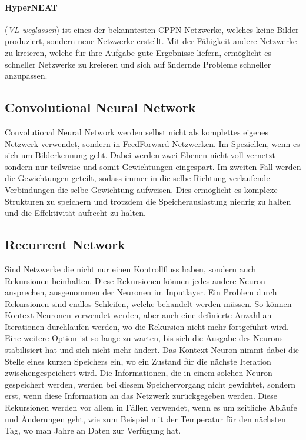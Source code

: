 \paragraph{HyperNEAT} (\textit{VL weglassen}) ist eines der bekanntesten CPPN Netzwerke, welches keine Bilder produziert, sondern neue Netzwerke erstellt.
Mit der Fähigkeit andere Netzwerke zu kreieren, welche für ihre Aufgabe gute Ergebnisse liefern, ermöglicht es schneller Netzwerke zu kreieren und sich auf ändernde Probleme schneller anzupassen.

\subsection{Convolutional Neural Network}

Convolutional Neural Network werden selbst nicht als komplettes eigenes Netzwerk verwendet, sondern in FeedForward Netzwerken.
Im Speziellen, wenn es sich um Bilderkennung geht.
Dabei werden zwei Ebenen nicht voll vernetzt sondern nur teilweise und somit Gewichtungen eingespart.
Im zweiten Fall werden die Gewichtungen geteilt, sodass immer in die selbe Richtung verlaufende Verbindungen die selbe Gewichtung aufweisen.
Dies ermöglicht es komplexe Strukturen zu speichern und trotzdem die Speicherauslastung niedrig zu halten und die Effektivität aufrecht zu halten.


\subsection{Recurrent Network}

Sind Netzwerke die nicht nur einen Kontrollfluss haben, sondern auch Rekursionen beinhalten. 
Diese Rekursionen können jedes andere Neuron ansprechen, ausgenommen der Neuronen im Inputlayer.
Ein Problem durch Rekursionen sind endlos Schleifen, welche behandelt werden müssen.
So können Kontext Neuronen verwendet werden, aber auch eine definierte Anzahl an Iterationen durchlaufen werden, wo die Rekursion nicht mehr fortgeführt wird. 
Eine weitere Option ist so lange zu warten, bis sich die Ausgabe des Neurons stabilisiert hat und sich nicht mehr ändert.
Das Kontext Neuron nimmt dabei die Stelle eines kurzen Speichers ein, wo ein Zustand für die nächste Iteration zwischengespeichert wird.
Die Informationen, die in einem solchen Neuron gespeichert werden, werden bei diesem Speichervorgang nicht gewichtet, sondern erst, wenn diese Information an das Netzwerk zurückgegeben werden.
Diese Rekursionen werden vor allem in Fällen verwendet, wenn es um zeitliche Abläufe und Änderungen geht, wie zum Beispiel mit der Temperatur für den nächsten Tag, wo man Jahre an Daten zur Verfügung hat.

